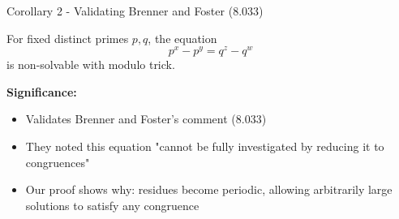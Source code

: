 \begin{frame}{Corollary 2 - Validating Brenner and Foster (8.033)}
    \begin{corollarys}
        For fixed distinct primes $p,q$, the equation
        \[p^x - p^y = q^z - q^w\]
        is non-solvable with modulo trick.
    \end{corollarys}

    \vspace{0.3cm}
    \textbf{Significance:}
    \begin{itemize}
        \item Validates Brenner and Foster's comment (8.033)
        \item They noted this equation "cannot be fully investigated by reducing it to congruences"
        \item Our proof shows why: residues become periodic, allowing arbitrarily large solutions to satisfy any congruence
    \end{itemize}
\end{frame}
